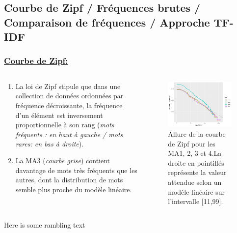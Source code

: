 \documentclass[xcolor=dvipsnames]{beamer}
\begin{document}
	\subsection*{Courbe de Zipf / Fréquences brutes / Comparaison de fréquences / Approche TF-IDF}

	\begin{frame}
		\frametitle{\underline{Courbe de Zipf:}}
		\begin{columns}
			\begin{column}{0.5\textwidth} %
				\begin{enumerate}
					\item La loi de Zipf stipule que dans une collection de données ordonnées par fréquence décroissante, la fréquence d'un élément est inversement proportionnelle à son rang (\textit{mots fréquents : en haut à gauche / mots rares: en bas à droite}).  
					\item La MA3 (\textit{courbe grise}) contient davantage de mots très fréquents que les autres, dont la distribution de mots semble plus proche du modèle linéaire.
				\end{enumerate}
			\end{column}
			\begin{column}{0.5\textwidth}
				\begin{figure}[htb] %
					\begin{center} %
						\includegraphics[width=1\textwidth]{curve_zipf.png}
						\caption{Allure de la courbe de Zipf pour les MA1, 2, 3 et 4.La droite en pointillés représente la valeur attendue selon un modèle linéaire sur l’intervalle
						[11,99].}\label{Zipf}
					\end{center}
				\end{figure}
			\end{column}
		\end{columns}
		\vspace{\baselineskip}
		Here is some rambling text
	\end{frame}
\end{document}
